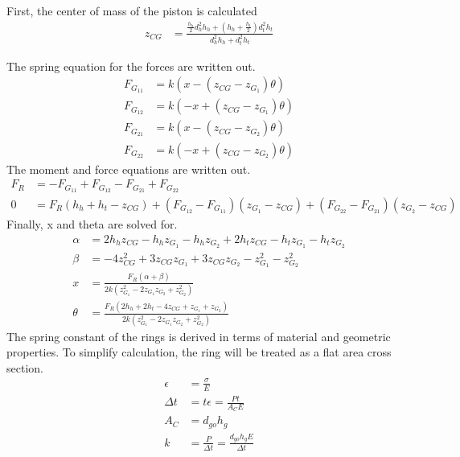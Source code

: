 \documentclass[10pt,a4paper]{article}
\begin{document}
	First, the center of mass of the piston is calculated
	\begin{align}
		z_{CG} &= \frac{\frac{h_h}{2}d_h^2 h_h + (h_h+ \frac{h_t}{2}) d_t^2 h_t}{d_h^2 h_h + d_t^2 h_t }
	\end{align}
	
	The spring equation for the forces are written out.
	\begin{align}
		F_{G_{11}} &= k(x - (z_{CG}-z_{G_1}) \theta) \\
		F_{G_{12}} &= k(-x + (z_{CG}-z_{G_1}) \theta) \\
		F_{G_{21}} &= k(x - (z_{CG}-z_{G_2}) \theta) \\
		F_{G_{22}} &= k(-x + (z_{CG}-z_{G_2}) \theta) 
	\end{align}
	The moment and force equations are written out.
	\begin{align}
		F_R &= - F_{G_{11}} + F_{G_{12}} - F_{G_{21}} + F_{G_{22}}\\
		0 &= F_R (h_h + h_t - z_{CG}) + (F_{G_{12}} - F_{G_{11}})(z_{G_1} - z_{CG})+ (F_{G_{22}} - F_{G_{21}})(z_{G_2} - z_{CG})
	\end{align}
	Finally, x and theta are solved for.
	\begin{align}
	\alpha &= 2 h_{h} z_{CG} - h_{h} z_{G_1} - h_{h} z_{G_2} + 2 h_{t} z_{CG} - h_{t} z_{G_1} - h_{t} z_{G_2}\\
	\beta &= - 4 z_{CG}^{2} + 3 z_{CG} z_{G_1} + 3 z_{CG} z_{G_2} - z_{G_1}^{2} - z_{G_2}^{2}\\
		x &= \frac{F_{R} \left(\alpha +\beta\right)}{2 k \left(z_{G_1}^{2} - 2 z_{G_1} z_{G_2} + z_{G_2}^{2}\right)}\\
		\theta &= \frac{F_{R} \left(2 h_{h} + 2 h_{t} - 4 z_{CG} + z_{G_1} + z_{G_2}\right)}{2 k \left(z_{G_1}^{2} - 2 z_{G_1} z_{G_2} + z_{G_2}^{2}\right)}
	\end{align}
	The spring constant of the rings is derived in terms of material and geometric properties. To simplify calculation, the ring will be treated as a flat area cross section.
	\begin{align}
		\epsilon &= \frac{\sigma}{E}\\
		\Delta t &= t \epsilon = \frac{Pt}{A_C E} \\
		A_C &= d_{go} h_g \\
		k &= \frac{P}{\Delta t} = \frac{d_{go} h_g E}{\Delta t}
	\end{align}
\end{document}
